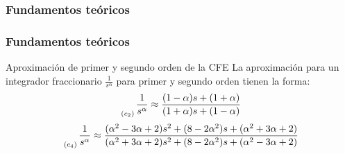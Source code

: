\documentclass[10pt]{beamer}
\begin{document}
	\begin{frame}
		\frametitle{Fundamentos teóricos}
			
	\end{frame}		
	\begin{frame}
		\frametitle{Fundamentos teóricos}
		\begin{block}{Aproximación de primer y segundo orden de la CFE}
		\justifying
			La aproximación para un integrador fraccionario $\frac{1}{s^{\alpha}}$ para primer y segundo orden tienen la forma:
			\vspace{0.25cm}
			\begin{equation}
				\genfrac{}{}{0pt}{0}{}{_{(c_{2})}} \frac{1}{s^{\alpha}} \approx \frac{(1 - \alpha)s + (1 + \alpha) }{(1 + \alpha)s + (1 - \alpha)} 
			\end{equation}
			\vspace{0.25cm}
			\begin{equation}
		\genfrac{}{}{0pt}{0}{}{_{(c_{4})}} \frac{1}{s^{\alpha}} \approx \frac{(\alpha^{2} - 3\alpha + 2) s^{2} + (8 - 2 \alpha^{2})s + (\alpha^{2} + 3\alpha + 2) }{(\alpha^{2} + 3\alpha + 2) s^{2} + (8 - 2 \alpha^{2})s + (\alpha^{2} - 3\alpha + 2)}
	\end{equation}
		\end{block}
	\end{frame}	
\end{document}
